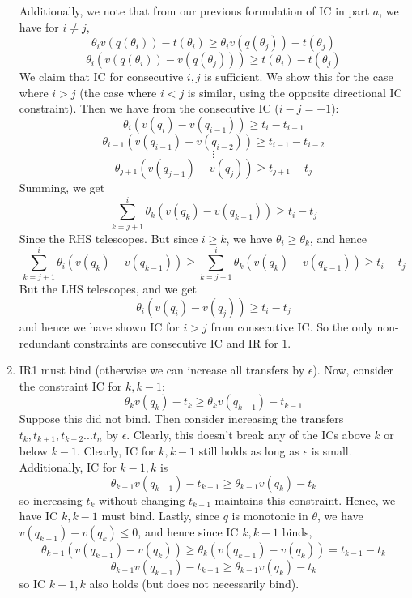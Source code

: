 \documentclass[10pt,letter]{article}
\begin{document}
\begin{enumerate}[label=(\alph*)]
Additionally, we note that from our previous formulation of IC in part $a$, we have for $i \neq j$,
\[ \theta_i v(q(\theta_i)) - t(\theta_i) \ge \theta_i v(q(\theta_j)) - t(\theta_j) \]
\[ \theta_i (v(q(\theta_i)) - v(q(\theta_j))) \ge t(\theta_i)  - t(\theta_j) \]
We claim that IC for consecutive $i,j$ is sufficient. We show this for the case where $i > j$ (the case where $i < j$ is similar, using the opposite directional IC constraint). Then we have from the consecutive IC ($i-j = \pm 1$):
\[ \theta_i (v(q_i) - v(q_{i-1})) \ge t_i - t_{i-1} \]
\[ \theta_{i-1} (v(q_{i-1}) - v(q_{i-2})) \ge t_{i-1} - t_{i-2} \]
\[ \vdots \]
\[ \theta_{j+1} (v(q_{j+1}) - v(q_{j})) \ge t_{j+1} - t_{j} \]
Summing, we get
\[ \sum_{k = j+1}^{i} \theta_k (v(q_k) - v(q_{k-1})) \ge t_i - t_j  \]
Since the RHS telescopes. But since $i \ge k$, we have $\theta_i \ge \theta_k$, and hence
\[ \sum_{k = j+1}^{i} \theta_i (v(q_k) - v(q_{k-1})) \ge \sum_{k = j+1}^{i} \theta_k (v(q_k) - v(q_{k-1})) \ge t_i - t_j  \]
But the LHS telescopes, and we get
\[ \theta_i (v(q_i) - v(q_j)) \ge t_i - t_j \]
and hence we have shown IC for $i > j$ from consecutive IC.
So the only non-redundant constraints are consecutive IC and IR for $1$.
\item IR1 must bind (otherwise we can increase all transfers by $\epsilon$). Now, consider the constraint IC for $k, k-1$:
\[ \theta_k v(q_k) - t_k \ge \theta_{k} v(q_{k-1}) - t_{k-1} \]
Suppose this did not bind. Then consider increasing the transfers $t_k, t_{k+1}, t_{k+2} ... t_n$ by $\epsilon$. Clearly, this doesn't break any of the ICs above $k$ or below $k-1$. Clearly, IC for $k, k-1$ still holds as long as $\epsilon$ is small. Additionally, IC for $k-1, k$ is
\[ \theta_{k-1} v(q_{k-1}) - t_{k-1} \ge \theta_{k-1} v(q_k) - t_k  \]
so increasing $t_k$ without changing $t_{k-1}$ maintains this constraint. Hence, we have IC $k, k-1$ must bind. Lastly, since $q$ is monotonic in $\theta$, we have $v(q_{k-1}) - v(q_k) \le 0$, and hence since IC $k, k-1$ binds,
\[ \theta_{k-1} (v(q_{k-1}) - v(q_k)) \ge \theta_k(v(q_{k-1}) - v(q_k)) = t_{k-1} - t_k \]
\[ \theta_{k-1} v(q_{k-1}) - t_{k-1} \ge \theta_{k-1} v(q_k) - t_k\]
so IC $k-1, k$ also holds (but does not necessarily bind).
\end{enumerate}
\end{document}
